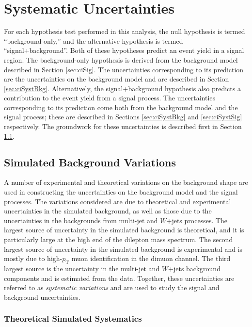 \section{Systematic Uncertainties}\label{sec:ciSyst}

For each hypothesis test performed in this analysis, the null hypothesis is termed ``background-only,'' and the alternative hypothesis is termed ``signal+background''.
Both of these hypotheses predict an event yield in a signal region.
The background-only hypothesis is derived from the background model described in Section \ref{sec:ciSig}.
The uncertainties corresponding to its prediction are the uncertainties on the background model and are described in Section \ref{sec:ciSystBkg}.
Alternatively, the signal+background hypothesis also predicts a contribution to the event yield from a signal process.
The uncertainties corresponding to its prediction come both from the background model and the signal process; these are described in Sections \ref{sec:ciSystBkg} and \ref{sec:ciSystSig} respectively.
The groundwork for these uncertainties is described first in Section \ref{sec:ciSystVars}.

\subsection{Simulated Background Variations}\label{sec:ciSystVars}

A number of experimental and theoretical variations on the background shape are used in constructing the uncertainties on the background model and the signal processes.
The variations considered are due to theoretical and experimental uncertainties in the simulated background, as well as those due to the uncertainties in the backgrounds from multi-jet and $W$+jets processes.
The largest source of uncertainty in the simulated background is theoretical, and it is particularly large at the high end of the dilepton mass spectrum.
The second largest source of uncertainty in the simulated background is experimental and is mostly due to high-$p_\text{T}$ muon identification in the dimuon channel.
The third largest source is the uncertainty in the multi-jet and $W$+jets background components and is estimated from the data.
Together, these uncertainties are referred to as \emph{systematic variations} and are used to study the signal and background uncertainties.

\subsubsection{Theoretical Simulated Systematics}\label{sec:ciThySyst}

